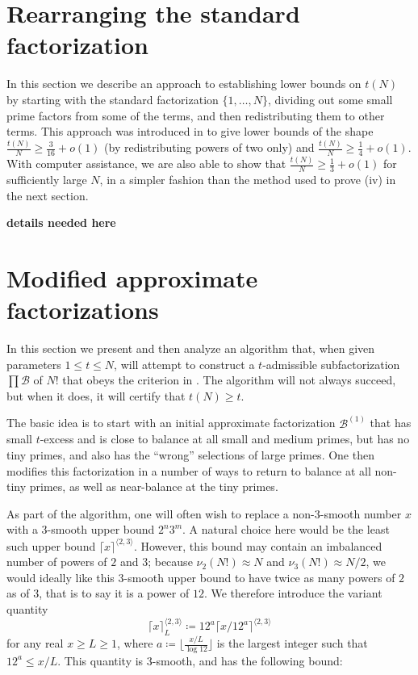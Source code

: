 \documentclass[12pt,a4paper,reqno]{amsart}
\numberwithin{equation}{section}
\theoremstyle{plain}
\theoremstyle{definition}
\newcommand\tuple{{\mathcal B}}
\begin{document}
\section{Rearranging the standard factorization}\label{rerrange-sec}

In this section we describe an approach to establishing lower bounds on $t(N)$ by starting with the standard factorization $\{1,\dots,N\}$, dividing out some small prime factors from some of the terms, and then redistributing them to other terms.  This approach was introduced in \cite{guy} to give lower bounds of the shape $\frac{t(N)}{N} \geq \frac{3}{16} + o(1)$ (by redistributing powers of two only) and $\frac{t(N)}{N} \geq \frac{1}{4} + o(1)$.  With computer assistance, we are also able to show that $\frac{t(N)}{N} \geq \frac{1}{3}+o(1)$ for sufficiently large $N$, in a simpler fashion than the method used to prove (iv) in the next section.

\textbf{details needed here}


\section{Modified approximate factorizations}\label{approx-sec}

In this section we present and then analyze an algorithm that, when given parameters $1 \leq t \leq N$, will attempt to construct a $t$-admissible subfactorization $\prod \tuple$ of $N!$ that obeys the criterion in .  The algorithm will not always succeed, but when it does, it will certify that $t(N) \geq t$.

The basic idea is to start with an initial approximate factorization $\tuple^{(1)}$ that has small $t$-excess and is close to balance at all small and medium primes, but has no tiny primes, and also has the ``wrong'' selections of large primes.  One then modifies this factorization in a number of ways to return to balance at all non-tiny primes, as well as near-balance at the tiny primes. 

As part of the algorithm, one will often wish to replace a non-$3$-smooth number $x$ with a $3$-smooth upper bound $2^n 3^m$.  A natural choice here would be the least such upper bound $\lceil x \rceil^{\langle 2,3 \rangle}$.  However, this bound may contain an imbalanced number of powers of $2$ and $3$; because $\nu_2(N!) \approx N$ and $\nu_3(N!) \approx N/2$, we would ideally like this $3$-smooth upper bound to have twice as many powers of $2$ as of $3$, that is to say it is a power of $12$.  We therefore introduce the variant quantity
$$ \lceil x \rceil^{\langle 2,3\rangle}_L \coloneqq 12^a \lceil x/12^a \rceil^{\langle 2,3 \rangle}$$
for any real $x \geq L \geq 1$, where $a \coloneqq \lfloor \frac{x/L}{\log 12} \rfloor$ is the largest integer such that $12^a \leq x/L$.  This quantity is $3$-smooth, and has the following bound:
\end{document}
